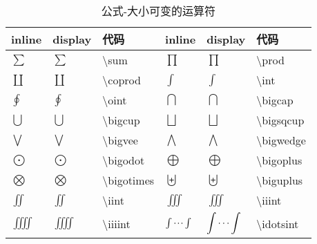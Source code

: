 \documentclass[UTF8,fontset=ubuntu]{ctexart}
\begin{document}
\begin{table}[H]
\begin{minipage}{\textwidth}
\begin{tabular}{l l l l l l}
    \hline
    inline & display & 代码 & inline & display & 代码\\
    \hline
    $\sum$ & $\displaystyle\sum$ & \textbackslash sum & $\prod$ & $\displaystyle\prod$ & \textbackslash prod\\
	$\coprod$ & $\displaystyle\coprod$ & \textbackslash coprod & $\int$ & $\displaystyle\int$ & \textbackslash  int\\
	$\oint$ & $\displaystyle\oint$ & \textbackslash  oint & $\bigcap$ & $\displaystyle\bigcap$ & \textbackslash  bigcap\\
    $\bigcup$ & $\displaystyle\bigcup$ & \textbackslash  bigcup & $\bigsqcup$ & $\displaystyle\bigsqcup$ & \textbackslash  bigsqcup\\
	$\bigvee$ & $\displaystyle\bigvee$ & \textbackslash  bigvee & $\bigwedge$ & $\displaystyle\bigwedge$ & \textbackslash  bigwedge\\
	$\bigodot$ & $\displaystyle\bigodot$ & \textbackslash  bigodot & $\bigoplus$ & $\displaystyle\bigoplus$ & \textbackslash  bigoplus\\
    $\bigotimes$ & $\displaystyle\bigotimes$ & \textbackslash  bigotimes & $\biguplus$ & $\displaystyle\biguplus$ & \textbackslash  biguplus\\
	$\iint$ & $\displaystyle\iint$ & \textbackslash  iint & $\iiint$ & $\displaystyle\iiint$ & \textbackslash  iiint\\
	$\iiiint$ & $\displaystyle\iiiint$ & \textbackslash  iiiint & $\idotsint$ & $\displaystyle\idotsint$ & \textbackslash  idotsint\\
	\hline
\end{tabular}
\end{minipage}
\caption{公式-大小可变的运算符}
\end{table}
\end{document}
